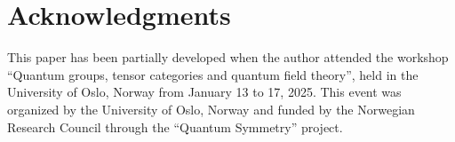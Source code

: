 \documentclass{amsart}
\begin{document}
\section{Acknowledgments}
This paper has been partially developed when the author attended the workshop “Quantum groups, tensor categories and quantum field theory”, held in the University of Oslo, Norway from January 13 to 17, 2025. This event was organized by the University of Oslo, Norway and funded by the Norwegian Research Council through the “Quantum Symmetry” project.

 
 
 
\end{document}
